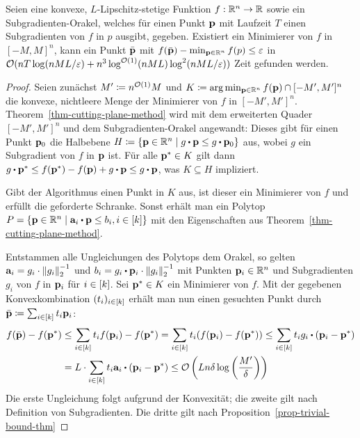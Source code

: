 \begin{theorem}\label{thm-approximate-solution}
	Seien eine konvexe, $L$-Lipschitz-stetige Funktion $f:\mathbb{R}^n\rightarrow \mathbb{R}$ sowie ein Subgradienten-Orakel, welches für einen Punkt $\mathbf{p}$ mit Laufzeit $T$ einen Subgradienten von $f$ in $p$ ausgibt, gegeben.
	Existiert ein Minimierer von $f$ in $[-M, M]^n$, kann ein Punkt $\bar{\mathbf{p}}$ mit $f(\bar{\mathbf{p}}) - \min_{\mathbf{p}\in\mathbb{R}^n} f(p)\leq \varepsilon$ in $\mathcal{O}(n T \log(n M L / \varepsilon) + n^3 \log^{\mathcal{O}(1)} (nML) \log^2(nML/\varepsilon) )$ Zeit gefunden werden.
\end{theorem}
\begin{proof}
	Seien zunächst $M'\coloneqq n^{\mathcal{O}(1)}M$ und $K\coloneqq \arg\min_{\mathbf{p}\in\mathbb{R}^n} f(\mathbf{p})\cap [-M', M']^n$ die konvexe, nichtleere Menge der Minimierer von $f$ in $[-M',M']^n$.
	Theorem~\ref{thm-cutting-plane-method} wird mit dem erweiterten Quader $[-M', M']^n$ und dem Subgradienten-Orakel angewandt:
	Dieses gibt für einen Punkt $\mathbf{p}_0$ die Halbebene $H\coloneqq\{ \fp\in\R^n \mid g\bcdot \fp \leq g\bcdot \fp_0 \}$ aus, wobei $g$ ein Subgradient von $f$ in $\mathbf{p}$ ist.
	Für alle $\mathbf{p}^*\in K$ gilt dann $g\bcdot \fp^* \leq f(\fp^*) - f(\fp) + g \bcdot \fp \leq g \bcdot \fp$, was $K\subseteq H$ impliziert.
	
	Gibt der Algorithmus einen Punkt in $K$ aus, ist dieser ein Minimierer von $f$ und erfüllt die geforderte Schranke.
	Sonst erhält man ein Polytop $P= \{ \fp\in\R^n \mid \fa_i \bcdot \fp \leq b_i, i\in\first{k} \}$ mit den Eigenschaften aus Theorem~\ref{thm-cutting-plane-method}.
	
	Entstammen alle Ungleichungen des Polytops dem Orakel, so gelten $\mathbf{a}_i = g_i\cdot \left\lVert g_i \right\rVert_2^{-1}$ und $b_i = g_i\bcdot \fp_i \cdot \norm{g_i}^{-1}$ mit Punkten $\mathbf{p}_i\in\mathbb{R}^n$ und Subgradienten $g_i$ von $f$ in $\mathbf{p}_i$ für $i\in\left[ k \right]$.
	Sei $\mathbf{p}^*\in K$ ein Minimierer von $f$.
	Mit der gegebenen Konvexkombination $(t_i)_{i\in\left[ k \right]}$ erhält man nun einen gesuchten Punkt durch $\bar{\mathbf{p}} \coloneqq \sum_{i\in\left[ k \right]} t_i \mathbf{p}_i$:
	\begin{align*}
		f(\bar{\fp}) - f(\fp^*)
		&\leq \sum_{i\in\first{k}} t_i f(\fp_i) - f(\fp^*)
		= \sum_{i\in\first{k}} t_i (f(\fp_i) - f(\fp^*))
		\leq \sum_{i\in\first{k}} t_i g_i \bcdot (\fp_i - \fp^*) \\
		&= L\cdot \sum_{i\in\first{k}}  t_i \fa_i \bcdot (\fp_i - \fp^*)
		\leq \bigO\left(
			Ln\delta\log\left( \frac{M'}{\delta} \right)
		\right)
	\end{align*}
	Die erste Ungleichung folgt aufgrund der Konvexität; die zweite gilt nach Definition von Subgradienten.
	Die dritte gilt nach Proposition~\ref{prop-trivial-bound-thm}
	

\end{proof}
